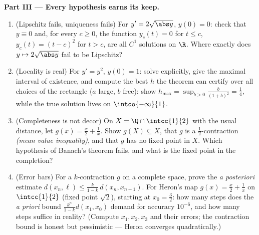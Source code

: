 \begin{problem}
\medskip
\noindent\textbf{Part III --- Every hypothesis earns its keep.}
\begin{enumerate}[resume]
  \item (Lipschitz fails, uniqueness fails) For $y' =
        2\sqrt{\abs y}$, $y(0) = 0$: check that $y \equiv 0$
        and, for every $c \geq 0$, the function $y_c(t) = 0$ for
        $t \leq c$, $y_c(t) = (t - c)^2$ for $t > c$, are all
        $C^1$ solutions on $\R$. Where exactly does $y \mapsto
        2\sqrt{\abs y}$ fail to be Lipschitz?
  \item (Locality is real) For $y' = y^2$, $y(0) = 1$: solve
        explicitly, give the maximal interval of existence, and
        compute the best $h$ the theorem can certify over all
        choices of the rectangle ($a$ large, $b$ free): show
        $h_{\max} = \sup_{b>0} \frac{b}{(1+b)^2} = \frac14$,
        while the true solution lives on $\intoo{-\infty}{1}$.
  \item (Completeness is not decor) On $X = \Q \cap
        \intcc{1}{2}$ with the usual distance, let $g(x) =
        \frac x2 + \frac1x$. Show $g(X) \subseteq X$, that $g$
        is a $\frac12$-contraction \emph{(mean value
        inequality)}, and that $g$ has no fixed point in $X$.
        Which hypothesis of Banach's theorem fails, and what is
        the fixed point in the completion?
  \item (Error bars) For a $k$-contraction $g$ on a complete
        space, prove the \emph{a posteriori} estimate $d(x_n,
        \ell) \leq \frac{k}{1-k}\,d(x_n, x_{n-1})$. For Heron's
        map $g(x) = \frac x2 + \frac 1x$ on $\intcc{1}{2}$
        (fixed point $\sqrt2$), starting at $x_0 = \frac32$:
        how many steps does the \emph{a priori} bound
        $\frac{k^n}{1-k}d(x_1, x_0)$ demand for accuracy
        $10^{-6}$, and how many steps suffice in reality?
        (Compute $x_1, x_2, x_3$ and their errors; the
        contraction bound is honest but pessimistic ---
        Heron converges quadratically.)
\end{enumerate}


\end{problem}
